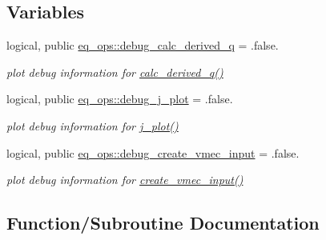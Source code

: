 \subsection*{Variables}
\begin{DoxyCompactItemize}
\item 
logical, public \hyperlink{namespaceeq__ops_a1b6609a8d8b427d9133bf323e732f209}{eq\+\_\+ops\+::debug\+\_\+calc\+\_\+derived\+\_\+q} = .false.
\begin{DoxyCompactList}\small\item\em plot debug information for \hyperlink{namespaceeq__ops_a087e08ce6d8ad381b5bac8fc51148d50}{calc\+\_\+derived\+\_\+q()} \end{DoxyCompactList}\item 
logical, public \hyperlink{namespaceeq__ops_a45ba7f46fd439bbd73edfd1fd548b58e}{eq\+\_\+ops\+::debug\+\_\+j\+\_\+plot} = .false.
\begin{DoxyCompactList}\small\item\em plot debug information for \hyperlink{namespaceeq__ops_afabdf28e5c26ceb87e6eb8cf3809919d}{j\+\_\+plot()} \end{DoxyCompactList}\item 
logical, public \hyperlink{namespaceeq__ops_a07ca60790a262e20bc8632be1530970a}{eq\+\_\+ops\+::debug\+\_\+create\+\_\+vmec\+\_\+input} = .false.
\begin{DoxyCompactList}\small\item\em plot debug information for \hyperlink{namespaceeq__ops_a9addef683b3d4a8c587510e4c994ec61}{create\+\_\+vmec\+\_\+input()} \end{DoxyCompactList}\end{DoxyCompactItemize}


\subsection{Function/\+Subroutine Documentation}
\mbox{\label{eq__ops_8f90_a369b73b541213d572d7197e0d549c014}} 
